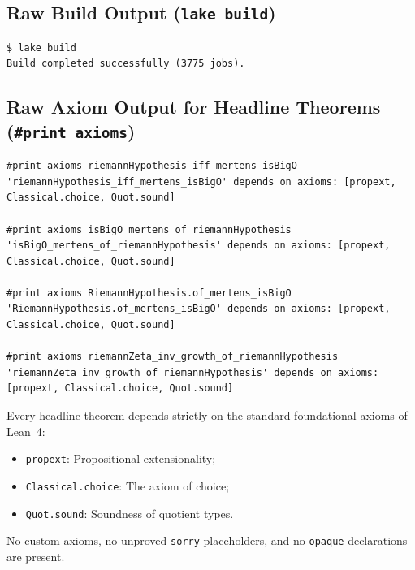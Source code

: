 \documentclass[11pt,a4paper]{article}
\theoremstyle{definition}
\begin{document}
\subsection{Raw Build Output (\texttt{lake build})}
\begin{lstlisting}[mathescape=false]
$ lake build
Build completed successfully (3775 jobs).
\end{lstlisting}

\subsection{Raw Axiom Output for Headline Theorems (\texttt{\#print axioms})}
\begin{lstlisting}[mathescape=false]
#print axioms riemannHypothesis_iff_mertens_isBigO
'riemannHypothesis_iff_mertens_isBigO' depends on axioms: [propext, Classical.choice, Quot.sound]

#print axioms isBigO_mertens_of_riemannHypothesis
'isBigO_mertens_of_riemannHypothesis' depends on axioms: [propext, Classical.choice, Quot.sound]

#print axioms RiemannHypothesis.of_mertens_isBigO
'RiemannHypothesis.of_mertens_isBigO' depends on axioms: [propext, Classical.choice, Quot.sound]

#print axioms riemannZeta_inv_growth_of_riemannHypothesis
'riemannZeta_inv_growth_of_riemannHypothesis' depends on axioms: [propext, Classical.choice, Quot.sound]
\end{lstlisting}

Every headline theorem depends strictly on the standard foundational axioms of Lean~4:
\begin{itemize}
  \item \texttt{propext}: Propositional extensionality;
  \item \texttt{Classical.choice}: The axiom of choice;
  \item \texttt{Quot.sound}: Soundness of quotient types.
\end{itemize}
No custom axioms, no unproved \texttt{sorry} placeholders, and no \texttt{opaque} declarations are present.
\end{document}
